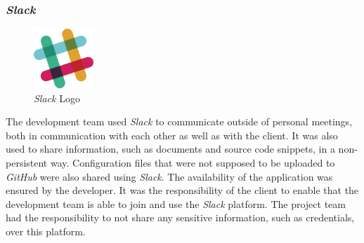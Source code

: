 \subsubsection{\textit{Slack}}
\label{sssec:slack}

\begin{figure}[H]
    \begin{center}
        \includegraphics[width=0.2\textwidth]{images/logos/slack-logo.png}
        \caption{\textit{Slack} Logo}
        \label{fig:slack-logo}
    \end{center}
\end{figure}

The development team used \textit{Slack} to communicate outside of personal meetings, both in communication with each other as well as with the client. It was also used to share information, such as documents and source code snippets, in a non-persistent way. Configuration files that were not supposed to be uploaded to \textit{GitHub} were also shared using \textit{Slack}.
\newline
The availability of the application was ensured by the developer. It was the responsibility of the client to enable that the development team is able to join and use the \textit{Slack} platform. The project team had the responsibility to not share any sensitive information, such as credentials, over this platform.